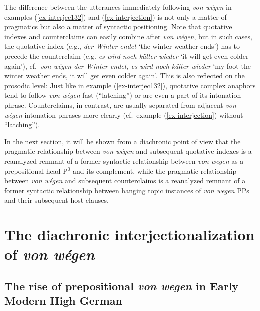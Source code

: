 \documentclass[output=paper
  ,nobabel
  ,draftmode
  ,babelshorthands
  ,colorlinks, citecolor=brown
]{langscibook}
\begin{document}
\noindent
The difference between the utterances immediately following \emph{von wégen} in examples (\ref{ex-interjec132}) and (\ref{ex-interjection}) is not only a matter of pragmatics but also a matter of syntactic positioning. Note that quotative indexes and counterclaims can easily combine after \emph{von wégen}, but in such cases, the quotative index (e.g., \emph{der Winter endet} `the winter weather ends') has to precede the counterclaim (e.g. \emph{es wird noch kälter wieder} `it will get even colder again'), cf.\ \emph{von wégen der Winter endet, es wird noch kälter wieder} `my foot the winter weather ends, it will get even colder again'. This is also reflected on the prosodic level: Just like in example (\ref{ex-interjec132}), quotative complex anaphors tend to follow \emph{von wégen} fast (``latching'') or are even a part of its intonation phrase. Counterclaims, in contrast, are usually separated from adjacent \emph{von wégen} intonation phrases more clearly (cf.\ example (\ref{ex-interjection}) without ``latching'').

In the next section, it will be shown from a diachronic point of view that the pragmatic relationship between \emph{von wégen} and subsequent quotative indexes is a reanalyzed remnant of a former syntactic relationship between \emph{von wegen} as a prepositional head P$^0$ and its complement, while the pragmatic relationship between \emph{von wégen} and subsequent counterclaims is a reanalyzed remnant of a former syntactic relationship between hanging topic instances of \emph{von wegen} PPs and their subsequent host clauses.

\section{The diachronic interjectionalization of \emph{von wégen}}\label{sec-past-vw}
\subsection{The rise of prepositional \emph{von wegen} in Early Modern High German}\label{ssec-frnhd-vw}
\end{document}
